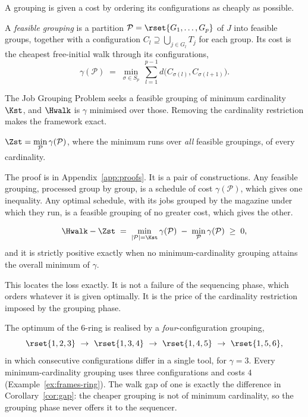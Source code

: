 A grouping is given a cost by ordering its configurations as cheaply as possible.

\begin{definition}\label{def:grouping}
A \emph{feasible grouping} is a partition $\mathcal{P}=\rset{G_1,\dots,G_p}$ of $J$
into feasible groups, together with a configuration $C_l\supseteq\bigcup_{j\in G_l}T_j$
for each group. Its cost is the cheapest free-initial walk through its
configurations,
\[
  \gamma(\mathcal{P})\;=\;\min_{\sigma\in S_p}\ \sum_{l=1}^{p-1}
  d\bigl(C_{\sigma(l)},C_{\sigma(l+1)}\bigr).
\]
\end{definition}

The Job Grouping Problem seeks a feasible grouping of minimum cardinality $\Kst$,
and $\Hwalk$ is $\gamma$ minimised over those. Removing the cardinality restriction
makes the framework exact.

\begin{theorem}\label{thm:grouping}
$\displaystyle \Zst=\min_{\mathcal{P}}\gamma(\mathcal{P})$, where the minimum runs
over \emph{all} feasible groupings, of every cardinality.
\end{theorem}

The proof is in Appendix~\ref{app:proofs}. It is a pair of constructions. Any
feasible grouping, processed group by group, is a schedule of cost
$\gamma(\mathcal{P})$, which gives one inequality. Any optimal schedule, with its
jobs grouped by the magazine under which they run, is a feasible grouping of no
greater cost, which gives the other.

\begin{corollary}\label{cor:gap}
\[
  \Hwalk-\Zst \;=\; \min_{\lvert\mathcal{P}\rvert=\Kst}\gamma(\mathcal{P})
  \;-\;\min_{\mathcal{P}}\gamma(\mathcal{P})\;\ge\;0,
\]
and it is strictly positive exactly when no minimum-cardinality grouping attains the
overall minimum of $\gamma$.
\end{corollary}

This locates the loss exactly. It is not a failure of the sequencing phase, which
orders whatever it is given optimally. It is the price of the cardinality
restriction imposed by the grouping phase.

\begin{example}\label{ex:ring-why}
The optimum of the $6$-ring is realised by a \emph{four}-configuration grouping,
\[
  \rset{1,2,3}\ \to\ \rset{1,3,4}\ \to\ \rset{1,4,5}\ \to\ \rset{1,5,6},
\]
in which consecutive configurations differ in a single tool, for $\gamma=3$. Every
minimum-cardinality grouping uses three configurations and costs $4$
(Example~\ref{ex:frames-ring}). The walk gap of one is exactly the difference in
Corollary~\ref{cor:gap}: the cheaper grouping is not of minimum cardinality, so the
grouping phase never offers it to the sequencer.
\end{example}

